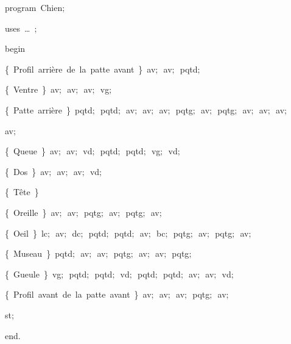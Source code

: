 
{
\parindent {}
\medskip

\carrenoir
\vspace{\neglskip}\mbox{\blc  \idt  \mcl program\idt \ Chien$;$
}\par 
\vspace{\neglskip}\mbox{\blc \blk\idt \mcl uses\idt \ \ldots\ $;$
}\par 
\vspace{\neglskip}\mbox{\blc  \idt  \mcl begin\idt }\par 
\vspace{\neglskip}\mbox{\blc  \blk\idt  \cmt  \{\ Profil\ arrière\ de\ la\ patte\ avant\ \}\idt \ av$;$\ av$;$\ pqtd$;$}\par 
\vspace{\neglskip}\mbox{\blc  \blk\idt  \cmt  \{\ Ventre\ \}\idt \ av$;$\ av$;$\ av$;$\ vg$;$\ }\par 
\vspace{\neglskip}\mbox{\blc  \blk\idt  \cmt  \{\ Patte\ arrière\ \}\idt \ pqtd$;$\ pqtd$;$\ av$;$\ av$;$\ av$;$\ pqtg$;$\ av$;$\ pqtg$;$\ av$;$\ av$;$\ av$;$\ }\par 
\vspace{\neglskip}\mbox{\blc  \blk\blk\blk\idt  av$;$}\par 
\vspace{\neglskip}\mbox{\blc  \blk\idt  \cmt  \{\ Queue\ \}\idt \ av$;$\ av$;$\ vd$;$\ pqtd$;$\ pqtd$;$\ vg$;$\ vd$;$\ }\par 
\vspace{\neglskip}\mbox{\blc  \blk\idt  \cmt  \{\ Dos\ \}\idt \ av$;$\ av$;$\ av$;$\ vd$;$}\par 
\vspace{\neglskip}\mbox{\blc  \blk\idt  \cmt  \{\ Tête\ \}\idt }\par 
\vspace{\neglskip}\mbox{\blc  \blk\blk\idt  \cmt  \{\ Oreille\ \}\idt \ av$;$\ av$;$\ pqtg$;$\ av$;$\ pqtg$;$\ av$;$}\par 
\vspace{\neglskip}\mbox{\blc  \blk\blk\idt  \cmt  \{\ Oeil\ \}\idt \ lc$;$\ av$;$\ dc$;$\ pqtd$;$\ pqtd$;$\ av$;$\ bc$;$\ pqtg$;$\ av$;$\ pqtg$;$\ av$;$}\par 
\vspace{\neglskip}\mbox{\blc  \blk\blk\idt  \cmt  \{\ Museau\ \}\idt \ pqtd$;$\ av$;$\ av$;$\ pqtg$;$\ av$;$\ av$;$\ pqtg$;$\ }\par 
\vspace{\neglskip}\mbox{\blc  \blk\blk\idt  \cmt  \{\ Gueule\ \}\idt \ vg$;$\ pqtd$;$\ pqtd$;$\ vd$;$\ pqtd$;$\ pqtd$;$\ av$;$\ av$;$\ vd$;$\ }\par 
\vspace{\neglskip}\mbox{\blc  \blk\idt  \cmt  \{\ Profil\ avant\ de\ la\ patte\ avant\ \}\idt \ av$;$\ av$;$\ av$;$\ pqtg$;$\ av$;$}\par 
\vspace{\neglskip}\mbox{\blc  \blk\idt  st$;$}\par 
\vspace{\neglskip}\mbox{\blc  \idt  \mcl end\idt $.$}\par 

\medskip }


